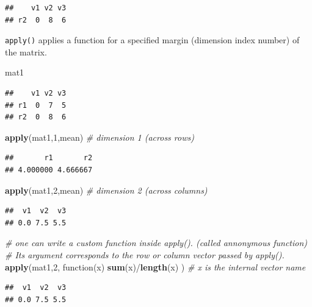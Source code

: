 \documentclass[]{book}
\newenvironment{Shaded}{\begin{snugshade}}{\end{snugshade}}
\newcommand{\KeywordTok}[1]{\textcolor[rgb]{0.13,0.29,0.53}{\textbf{{#1}}}}
\newcommand{\DecValTok}[1]{\textcolor[rgb]{0.00,0.00,0.81}{{#1}}}
\newcommand{\CommentTok}[1]{\textcolor[rgb]{0.56,0.35,0.01}{\textit{{#1}}}}
\newcommand{\NormalTok}[1]{{#1}}
\theoremstyle{definition}
\theoremstyle{definition}
\theoremstyle{remark}
\begin{document}
\begin{verbatim}
##    v1 v2 v3
## r2  0  8  6
\end{verbatim}

\texttt{apply()} applies a function for a specified margin (dimension
index number) of the matrix.

\begin{Shaded}
\begin{Highlighting}[]
\NormalTok{mat1}
\end{Highlighting}
\end{Shaded}

\begin{verbatim}
##    v1 v2 v3
## r1  0  7  5
## r2  0  8  6
\end{verbatim}

\begin{Shaded}
\begin{Highlighting}[]
\KeywordTok{apply}\NormalTok{(mat1,}\DecValTok{1}\NormalTok{,mean)  }\CommentTok{# dimension 1 (across rows)}
\end{Highlighting}
\end{Shaded}

\begin{verbatim}
##       r1       r2 
## 4.000000 4.666667
\end{verbatim}

\begin{Shaded}
\begin{Highlighting}[]
\KeywordTok{apply}\NormalTok{(mat1,}\DecValTok{2}\NormalTok{,mean)  }\CommentTok{# dimension 2 (across columns)}
\end{Highlighting}
\end{Shaded}

\begin{verbatim}
##  v1  v2  v3 
## 0.0 7.5 5.5
\end{verbatim}

\begin{Shaded}
\begin{Highlighting}[]
\CommentTok{# one can write a custom function inside apply(). (called annonymous function)    }
\CommentTok{# Its argument corresponds to the row or column vector passed by apply(). }
\KeywordTok{apply}\NormalTok{(mat1,}\DecValTok{2}\NormalTok{, function(x) }\KeywordTok{sum}\NormalTok{(x)/}\KeywordTok{length}\NormalTok{(x) )  }\CommentTok{# x is the internal vector name}
\end{Highlighting}
\end{Shaded}

\begin{verbatim}
##  v1  v2  v3 
## 0.0 7.5 5.5
\end{verbatim}
\end{document}
